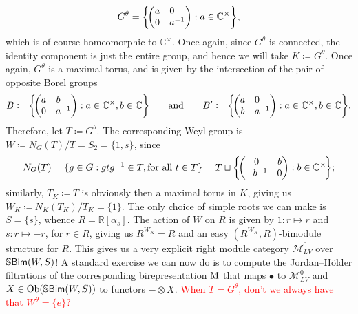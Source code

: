 \begin{example}
\begin{align*}
\begin{split}
G^\theta = \left\{\!\begin{pmatrix}a&0\hphantom{{}^{-1}}\\0&a^{-1}\end{pmatrix} : a \in \mathbb{C}^\times\right\}\!,
\end{split}
\end{align*}
\noindent which is of course homeomorphic to $\mathbb{C}^\times$. Once again, since $G^\theta$ is connected, the identity component is just the entire group, and hence we will take $K \coloneqq G^\theta$. Once again, $G^\theta$ is a maximal torus, and is given by the intersection of the pair of opposite Borel groups
\begin{align*}
\begin{split}
B \coloneqq \left\{\!\begin{pmatrix}a&b\hphantom{{}^{-1}}\\0&a^{-1}\end{pmatrix} : a \in \mathbb{C}^\times, b \in \mathbb{C}\right\}\!\qquad\text{and}\qquad B' \coloneqq \left\{\!\begin{pmatrix}a&0\hphantom{{}^{-1}}\\b&a^{-1}\end{pmatrix} : a \in \mathbb{C}^\times, b \in \mathbb{C}\right\}\!.
\end{split}
\end{align*}
\noindent Therefore, let $T \coloneqq G^\theta$. The corresponding Weyl group is $W \coloneqq N_G(T)/T = S_2 = \{1, s\}$, since
\begin{align*}
\begin{split}
N_G(T) = \{g \in G : gtg^{-1} \in T, \textnormal{for all $t \in T$}\} = T \sqcup \left\{\!\begin{pmatrix}0&b\\-b^{-1}&0\end{pmatrix} : b \in \mathbb{C}^\times\!\right\}\!;
\end{split}
\end{align*}
\noindent similarly, $T_K \coloneqq T$ is obviously then a maximal torus in $K$, giving us $W_K \coloneqq N_K(T_K)/T_K = \{1\}$. The only choice of simple roots we can make is $S = \{s\}$, whence $R = \mathbb{R}[\alpha_{s}]$. The action of $W$ on $R$ is given by $1 : r \mapsto r$ and $s : r \mapsto -r$, for $r \in R$, giving us $R^{W_K} = R$ and an easy $(R^{W_K}, R)$-bimodule structure for $R$. This gives us a very explicit right module category $\mathcal{M}_{LV}^0$ over $\mathbb{S}\textnormal{\textsf{Bim}}(W, S)$! A standard exercise we can now do is to compute the Jordan--H\"{o}lder filtrations of the corresponding birepresentation $\textnormal{M}$ that maps $\bullet$ to $\mathcal{M}_{LV}^0$ and $X \in \textnormal{Ob}(\mathbb{S}\textnormal{\textsf{Bim}}(W, S))$ to functors $- \otimes X$. \textcolor{red}{When $T = G^\theta$, don't we always have that $W^\theta = \{e\}$?}\\[-1.5\baselineskip]%

\end{example}
